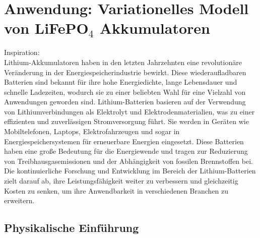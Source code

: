 \chapter[Anwendung: Variationelles Modell von LiFePO4 Akkumulatoren]{Anwendung: Variationelles Modell von LiFePO\(_4\) Akkumulatoren}{\label{ch:battery}}
Inspiration: \cite{Stinson_2021} \\
Lithium-Akkumulatoren haben in den letzten Jahrzehnten eine revolutionäre Veränderung in der Energiespeicherindustrie bewirkt. Diese wiederaufladbaren Batterien sind bekannt für ihre hohe Energiedichte, lange Lebensdauer und schnelle Ladezeiten, wodurch sie zu einer beliebten Wahl für eine Vielzahl von Anwendungen geworden sind. Lithium-Batterien basieren auf der Verwendung von Lithiumverbindungen als Elektrolyt und Elektrodenmaterialien, was zu einer effizienten und zuverlässigen Stromversorgung führt. Sie werden in Geräten wie Mobiltelefonen, Laptops, Elektrofahrzeugen und sogar in Energiespeichersystemen für erneuerbare Energien eingesetzt. Diese Batterien haben eine große Bedeutung für die Energiewende und tragen zur Reduzierung von Treibhausgasemissionen und der Abhängigkeit von fossilen Brennstoffen bei. Die kontinuierliche Forschung und Entwicklung im Bereich der Lithium-Batterien zielt darauf ab, ihre Leistungsfähigkeit weiter zu verbessern und gleichzeitig Kosten zu senken, um ihre Anwendbarkeit in verschiedenen Branchen zu erweitern.
\section{Physikalische Einführung}{\label{sec:phyintrobatt}}
